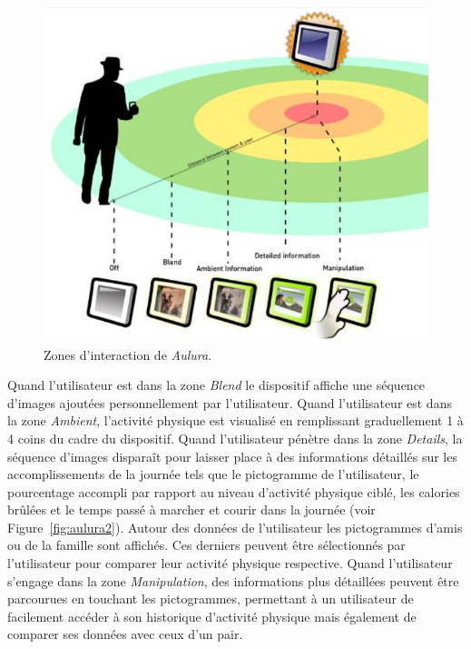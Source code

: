 \documentclass[10pt,a5paper,twoside]{article}
\begin{document}
\begin{figure}
\centering
\includegraphics[width=0.900\hsize]{images/Aulura-screenshot.png}
\caption{Zones d'interaction de \emph{Aulura}.}\label{fig:aulura1}
\end{figure}

Quand l'utilisateur est dans la zone \emph{Blend} le dispositif affiche
une séquence d'images ajoutées personnellement par l'utilisateur. Quand
l'utilisateur est dans la zone \emph{Ambient}, l'activité physique est
visualisé en remplissant graduellement 1 à 4 coins du cadre du
dispositif. Quand l'utilisateur pénètre dans la zone \emph{Details}, la
séquence d'images disparaît pour laisser place à des informations
détaillés sur les accomplissements de la journée tels que le pictogramme
de l'utilisateur, le pourcentage accompli par rapport au niveau
d'activité physique ciblé, les calories brûlées et le temps passé à
marcher et courir dans la journée (voir Figure~\ref{fig:aulura2}).
Autour des données de l'utilisateur les pictogrammes d'amis ou de la
famille sont affichés. Ces derniers peuvent être sélectionnés par
l'utilisateur pour comparer leur activité physique respective. Quand
l'utilisateur s'engage dans la zone \emph{Manipulation}, des
informations plus détaillées peuvent être parcourues en touchant les
pictogrammes, permettant à un utilisateur de facilement accéder à son
historique d'activité physique mais également de comparer ses données
avec ceux d'un pair.
\end{document}
